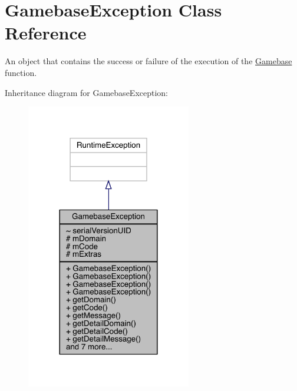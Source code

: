 \hypertarget{classcom_1_1toast_1_1android_1_1gamebase_1_1base_1_1_gamebase_exception}{}\section{Gamebase\+Exception Class Reference}
\label{classcom_1_1toast_1_1android_1_1gamebase_1_1base_1_1_gamebase_exception}


An object that contains the success or failure of the execution of the \hyperlink{classcom_1_1toast_1_1android_1_1gamebase_1_1_gamebase}{Gamebase} function.  




Inheritance diagram for Gamebase\+Exception\+:
\nopagebreak
\begin{figure}[H]
\begin{center}
\leavevmode
\includegraphics[width=204pt]{classcom_1_1toast_1_1android_1_1gamebase_1_1base_1_1_gamebase_exception__inherit__graph}
\end{center}
\end{figure}


